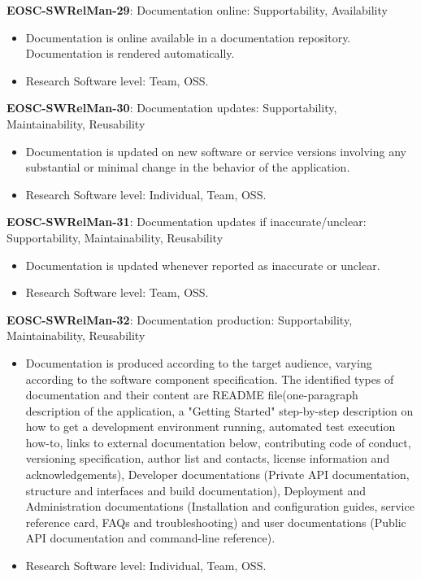 \textbf{EOSC-SWRelMan-29}: Documentation online: Supportability, Availability

\begin{itemize}
    \item Documentation is online available in a documentation repository. Documentation is rendered automatically. \cite{orviz_set_2017,orviz_fernandez_eosc-synergy_2020}
    \item Research Software level: Team, OSS.
\end{itemize}

\textbf{EOSC-SWRelMan-30}: Documentation updates: Supportability, Maintainability, Reusability

\begin{itemize}
    \item Documentation is updated on new software or service versions involving any substantial or minimal change in the behavior of the application. \cite{orviz_set_2017,orviz_fernandez_eosc-synergy_2020,raymond_software_2013}
    \item Research Software level: Individual, Team, OSS.
\end{itemize}

\textbf{EOSC-SWRelMan-31}: Documentation updates if inaccurate/unclear: Supportability, Maintainability, Reusability

\begin{itemize}
    \item Documentation is updated whenever reported as inaccurate or unclear. \cite{orviz_set_2017,orviz_fernandez_eosc-synergy_2020}
    \item Research Software level: Team, OSS.
\end{itemize}

\textbf{EOSC-SWRelMan-32}: Documentation production: Supportability, Maintainability, Reusability

\begin{itemize}
    \item Documentation is produced according to the target audience, varying according to the software component specification. The identified types of documentation and their content are README file(one-paragraph description of the application, a "Getting Started" step-by-step description on how to get a development environment running, automated test execution how-to, links to external documentation below, contributing code of conduct, versioning specification, author list and contacts, license information and acknowledgements), Developer documentations (Private API documentation, structure and interfaces and build documentation), Deployment and Administration documentations (Installation and configuration guides, service reference card, FAQs and troubleshooting) and user documentations (Public API documentation and command-line reference). \cite{aberdour_achieving_2007,shepherdson_cessda_2019,orviz_set_2017,orviz_fernandez_eosc-synergy_2020,raymond_software_2013}
    \item Research Software level: Individual, Team, OSS.
\end{itemize}

